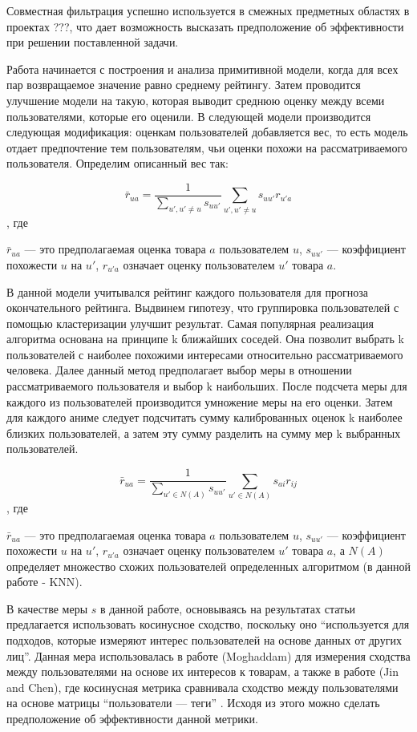 \documentclass[bachelor, och, diploma]{SCWorks}
\begin{document}
Совместная фильтрация успешно используется в смежных предметных областях в проектах ???, что дает возможность высказать предположение об эффективности при решении поставленной задачи.

Работа начинается с построения и анализа примитивной модели, когда для всех пар возвращаемое значение равно среднему рейтингу. Затем проводится улучшение модели на такую, которая выводит среднюю оценку между всеми пользователями, которые его оценили. В следующей модели производится следующая модификация: оценкам пользователей добавляется вес, то есть модель отдает предпочтение тем пользователям, чьи оценки похожи на рассматриваемого пользователя. Определим описанный вес так:

$$\bar r_{ua} = \frac{1}{\sum_{u', u' \neq u} s_{uu'}}  \sum_{u', u' \neq u} s_{uu'}r_{u'a}$$, где 

$\bar r_{ua}$ --- это предполагаемая оценка товара $a$ пользователем $u$, $s_{uu'}$ --- коэффициент похожести $u$ на $u'$, $r_{u'a}$ означает оценку пользователем $u'$ товара $a$.

В данной модели учитывался рейтинг каждого пользователя для прогноза окончательного рейтинга. Выдвинем гипотезу, что группировка пользователей с помощью кластеризации улучшит результат. Самая популярная реализация алгоритма основана на принципе k ближайших соседей. Она позволит выбрать k пользователей с наиболее похожими интересами относительно рассматриваемого человека. Далее данный метод предполагает выбор меры в отношении рассматриваемого пользователя и выбор k наибольших. После подсчета меры для каждого из пользователей производится умножение меры на его оценки. Затем для каждого аниме следует подсчитать сумму калиброванных оценок k наиболее близких пользователей, а затем эту сумму разделить на сумму мер k выбранных пользователей. 

$$\bar r_{ua} = \frac{1}{\sum_{u' \in N(A)} s_{uu'}}  \sum_{u' \in N(A)} s_{ai}r_{ij}$$, где 

$\bar r_{ua}$ --- это предполагаемая оценка товара $a$ пользователем $u$, $s_{uu'}$ --- коэффициент похожести $u$ на $u'$, $r_{u'a}$ означает оценку пользователем $u'$ товара $a$, а $N(A)$ определяет множество схожих пользователей определенных алгоритмом (в данной работе - KNN).

В качестве меры $s$ в данной работе, основываясь на результатах статьи 
предлагается использовать косинусное сходство, 
поскольку оно ``используется для подходов, которые измеряют интерес
 пользователей на основе данных от других лиц''. 
 Данная мера использовалась в работе (Moghaddam) для измерения сходства 
 между пользователями на основе их интересов к товарам, а также в работе (Jin and Chen), 
 где косинусная метрика сравнивала сходство между пользователями на основе матрицы 
 ``пользователи --- теги'' . Исходя из этого можно сделать предположение об эффективности данной метрики.
\end{document}
